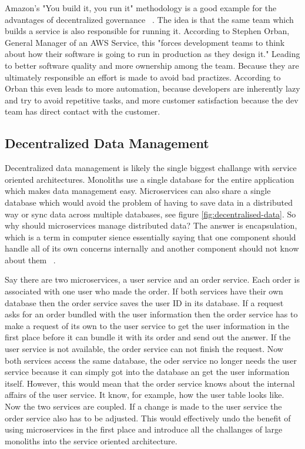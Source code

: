 Amazon's "You build it, you run it" methodology is a good example for the advantages of decentralized governance ~\cite{amazon.2015}. The idea is that the same team which builds a service is also responsible for running it. According to Stephen Orban, General Manager of an AWS Service, this "forces development teams to think about how their software is going to run in production as they design it." Leading to better software quality and more ownership among the team. Because they are ultimately responsible an effort is made to avoid bad practizes. According to Orban this even leads to more automation, because developers are inherently lazy and try to avoid repetitive tasks, and more customer satisfaction because the dev team has direct contact with the customer.


\subsection{Decentralized Data Management}

Decentralized data management is likely the single biggest challange with service oriented architectures. Monoliths use a single database for the entire application which makes data management easy. Microservices can also share a single database which would avoid the problem of having to save data in a distributed way or sync data across multiple databases, see figure \ref{fig:decentralised-data}. So why should microservices manage distributed data? The answer is encapsulation, which is a term in computer sience essentially saying that one component should handle all of its own concerns internally and another component should not know about them ~\cite{krivtsov.2019}.

Say there are two microservices, a user service and an order service. Each order is associated with one user who made the order. If both services have their own database then the order service saves the user ID in its database. If a request asks for an order bundled with the user information then the order service has to make a request of its own to the user service to get the user information in the first place before it can bundle it with its order and send out the answer. If the user service is not available, the order service can not finish the request. Now both services access the same database, the oder service no longer needs the user service because it can simply got into the database an get the user information itself. However, this would mean that the order service knows about the internal affairs of the user service. It know, for example, how the user table looks like. Now the two services are coupled. If a change is made to the user service the order service also has to be adjusted. This would effectively undo the benefit of using microservices in the first place and introduce all the challanges of large monoliths into the service oriented architecture.

